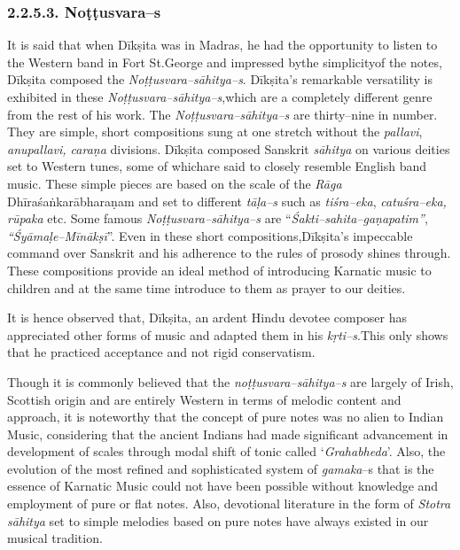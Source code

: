 \subsubsection*{2.2.5.3. Noṭṭusvara–s}

It is said that when Dīkṣita was in Madras, he had the opportunity to listen to the Western band in Fort St.George and impressed bythe simplicityof the notes, Dīkṣita composed the \textit{Noṭṭusvara–sāhitya–s}. Dīkṣita's remarkable versatility is exhibited in these \textit{Noṭṭusvara–sāhitya–s},\break which are a completely different genre from the rest of his work. The \textit{Noṭṭusvara–sāhitya–s} are thirty–nine in number. They are simple, short compositions sung at one stretch without the \textit{pallavi}, \textit{anupallavi, caraṇa} divisions. Dīkṣita composed Sanskrit \textit{sāhitya} on various deities set to Western tunes, some of whichare said to closely resemble English band music. These simple pieces are based on the scale of the \textit{Rāga} Dhīra\-śaṅkarābharaṇam and set to different \textit{tāḷa–s} such as \textit{tiśra–eka}, \textit{catuśra–eka, rūpaka} etc. Some famous \textit{Noṭṭusvara–sāhitya–s} are “\textit{Śakti–sahita–gaṇapatim”}, \textit{“Śyāmaḷe–Mīnākṣī}”. Even in these short compositions,\break Dīkṣita's impeccable command over Sanskrit and his adherence to the rules of prosody shines through. These compositions provide an ideal method of introducing Karnatic music to children and at the same time introduce to them as prayer to our deities.

It is hence observed that, Dīkṣita, an ardent Hindu devotee composer has appreciated other forms of music and adapted them in his \textit{kṛti–s}.\break This only shows that he practiced acceptance and not rigid conservatism.

Though it is commonly believed that the \textit{noṭṭusvara–sāhitya–s} are largely of Irish, Scottish origin and are entirely Western in terms of melodic content and approach, it is noteworthy that the concept of pure notes was no alien to Indian Music, considering that the ancient Indians had made significant advancement in development of scales through modal shift of tonic called ‘\textit{Grahabheda}’. Also, the evolution of the most refined and sophisticated system of \textit{gamaka}–s that is the essence of Karnatic Music could not have been possible without knowledge and employment of pure or flat notes. Also, devotional literature in the form of \textit{Stotra sāhitya} set to simple melodies based on pure notes have always existed in our musical tradition.

